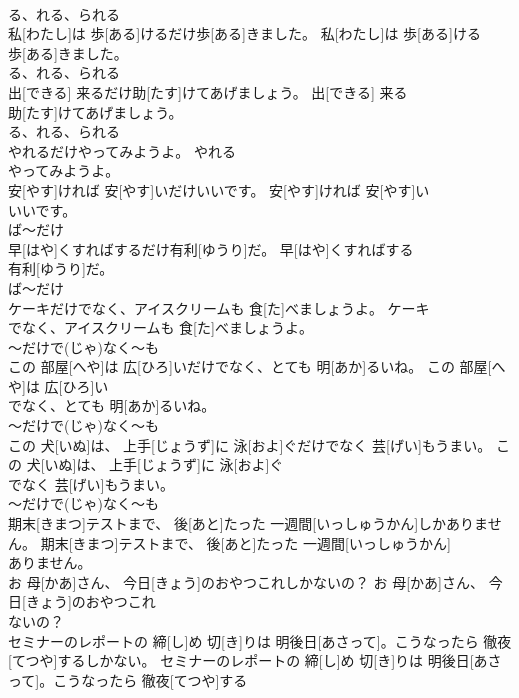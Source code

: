 \documentclass[8pt]{extreport}
\begin{document}
\begin{CJK}{UTF8}{min}
\\	る、れる、られる 
\\	私[わたし]は 歩[ある]けるだけ歩[ある]きました。	私[わたし]は 歩[ある]ける
\\	歩[ある]きました。	
\\	る、れる、られる 
\\	出[できる] 来るだけ助[たす]けてあげましょう。	出[できる] 来る
\\	助[たす]けてあげましょう。	
\\	る、れる、られる 
\\	やれるだけやってみようよ。	やれる
\\	やってみようよ。	
\\	安[やす]ければ 安[やす]いだけいいです。	安[やす]ければ 安[やす]い
\\	いいです。	
\\	ば～だけ
\\	早[はや]くすればするだけ有利[ゆうり]だ。	早[はや]くすればする
\\	有利[ゆうり]だ。	
\\	ば～だけ
\\	ケーキだけでなく、アイスクリームも 食[た]べましょうよ。	ケーキ
\\	でなく、アイスクリームも 食[た]べましょうよ。	
\\	～だけで(じゃ)なく～も
\\	この 部屋[へや]は 広[ひろ]いだけでなく、とても 明[あか]るいね。	この 部屋[へや]は 広[ひろ]い
\\	でなく、とても 明[あか]るいね。	
\\	～だけで(じゃ)なく～も
\\	この 犬[いぬ]は、 上手[じょうず]に 泳[およ]ぐだけでなく 芸[げい]もうまい。	この 犬[いぬ]は、 上手[じょうず]に 泳[およ]ぐ
\\	でなく 芸[げい]もうまい。	
\\	～だけで(じゃ)なく～も
\\	期末[きまつ]テストまで、 後[あと]たった 一週間[いっしゅうかん]しかありません。	期末[きまつ]テストまで、 後[あと]たった 一週間[いっしゅうかん]
\\	ありません。	
\\	お 母[かあ]さん、 今日[きょう]のおやつこれしかないの？	お 母[かあ]さん、 今日[きょう]のおやつこれ
\\	ないの？	
\\	セミナーのレポートの 締[し]め 切[き]りは 明後日[あさって]。こうなったら 徹夜[てつや]するしかない。	セミナーのレポートの 締[し]め 切[き]りは 明後日[あさって]。こうなったら 徹夜[てつや]する

\end{CJK}
\end{document}
